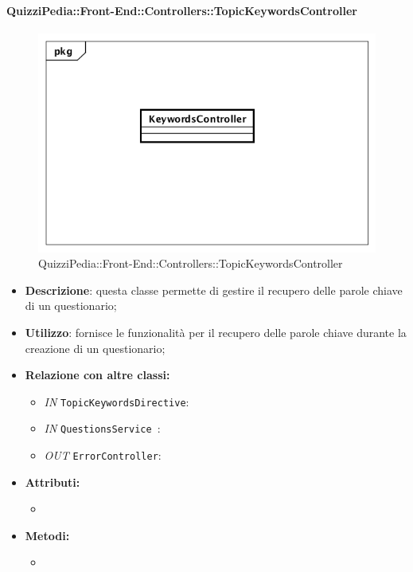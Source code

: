 \paragraph{QuizziPedia::Front-End::Controllers::TopicKeywordsController}
\begin{figure}
	\centering
	\includegraphics[scale=0.45]{UML/Classi/Front-End/QuizziPedia_Front-end_Controller_TopicKeywordsController.png}
	\caption{QuizziPedia::Front-End::Controllers::TopicKeywordsController}
\end{figure}
\begin{itemize}
	\item \textbf{Descrizione}: questa classe permette di gestire il recupero delle parole chiave di un questionario;
	\item \textbf{Utilizzo}: fornisce le funzionalità per il recupero delle parole chiave durante la creazione di un questionario;
	\item \textbf{Relazione con altre classi:}
	\begin{itemize}
		\item \textit{IN} \texttt{TopicKeywordsDirective}: 
		\item \textit{IN} \texttt{QuestionsService }: 
		\item \textit{OUT} \texttt{ErrorController}: 
	\end{itemize}
	\item \textbf{Attributi:}
	\begin{itemize}
		\item 
	\end{itemize}
	\item \textbf{Metodi:}
	\begin{itemize}
		\item 
	\end{itemize}
\end{itemize}

